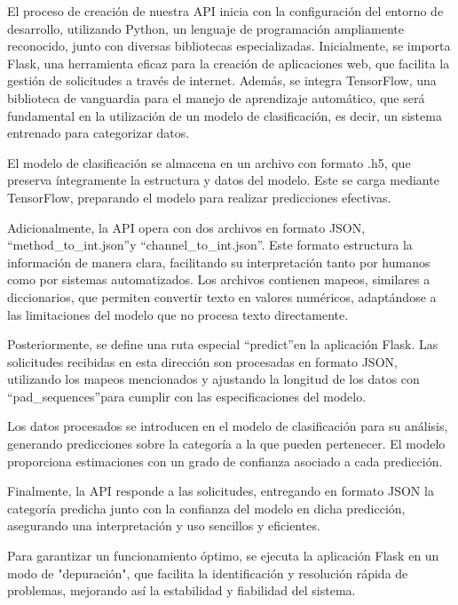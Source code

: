 El proceso de creación de nuestra API inicia con la configuración del entorno de desarrollo, utilizando Python, un lenguaje de programación ampliamente reconocido, junto con diversas bibliotecas especializadas. Inicialmente, se importa Flask, una herramienta eficaz para la creación de aplicaciones web, que facilita la gestión de solicitudes a través de internet. Además, se integra TensorFlow, una biblioteca de vanguardia para el manejo de aprendizaje automático, que será fundamental en la utilización de un modelo de clasificación, es decir, un sistema entrenado para categorizar datos.

El modelo de clasificación se almacena en un archivo con formato .h5, que preserva íntegramente la estructura y datos del modelo. Este se carga mediante TensorFlow, preparando el modelo para realizar predicciones efectivas.

Adicionalmente, la API opera con dos archivos en formato JSON, \textquotedblleft method\_to\_int.json\textquotedblright y \textquotedblleft channel\_to\_int.json\textquotedblright. Este formato estructura la información de manera clara, facilitando su interpretación tanto por humanos como por sistemas automatizados. Los archivos contienen mapeos, similares a diccionarios, que permiten convertir texto en valores numéricos, adaptándose a las limitaciones del modelo que no procesa texto directamente.

Posteriormente, se define una ruta especial \textquotedblleft\/predict\textquotedblright en la aplicación Flask. Las solicitudes recibidas en esta dirección son procesadas en formato JSON, utilizando los mapeos mencionados y ajustando la longitud de los datos con \textquotedblleft pad\_sequences\textquotedblright para cumplir con las especificaciones del modelo.

Los datos procesados se introducen en el modelo de clasificación para su análisis, generando predicciones sobre la categoría a la que pueden pertenecer. El modelo proporciona estimaciones con un grado de confianza asociado a cada predicción.

Finalmente, la API responde a las solicitudes, entregando en formato JSON la categoría predicha junto con la confianza del modelo en dicha predicción, asegurando una interpretación y uso sencillos y eficientes.

Para garantizar un funcionamiento óptimo, se ejecuta la aplicación Flask en un modo de "depuración", que facilita la identificación y resolución rápida de problemas, mejorando así la estabilidad y fiabilidad del sistema.